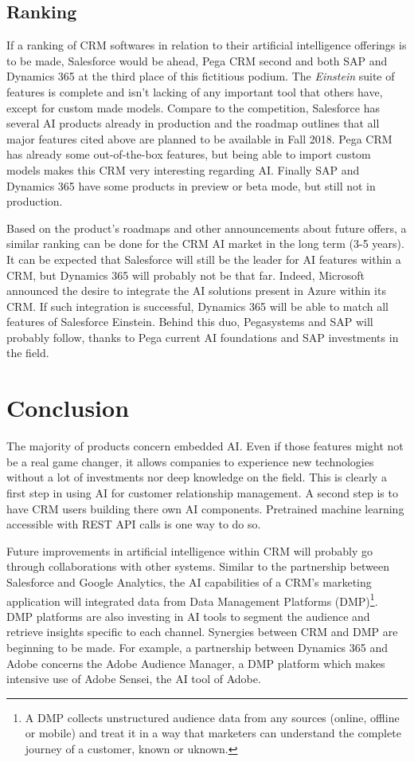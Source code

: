 \subsection{Ranking}
If a ranking of CRM softwares in relation to their artificial intelligence offerings is to be made, Salesforce would be ahead, Pega CRM second and both SAP and Dynamics 365 at the third place of this fictitious podium. The \textit{Einstein} suite of features is complete and isn't lacking of any important tool that others have, except for custom made models. Compare to the competition, Salesforce has several AI products already in production and the roadmap outlines that all major features cited above are planned to be available in Fall 2018. Pega CRM has already some out-of-the-box features, but being able to import custom models makes this CRM very interesting regarding AI. Finally SAP and Dynamics 365 have some products in preview or beta mode, but still not in production. 

Based on the product's roadmaps and other announcements about future offers, a similar ranking can be done for the CRM AI market in the long term (3-5 years). It can be expected that Salesforce will still be the leader for AI features within a CRM, but Dynamics 365 will probably not be that far. Indeed, Microsoft announced the desire to integrate the AI solutions present in Azure within its CRM. If such integration is successful, Dynamics 365 will be able to match all features of Salesforce Einstein. Behind this duo, Pegasystems and SAP will probably follow, thanks to Pega current AI foundations and SAP investments in the field. 


\section{Conclusion}
The majority of products concern embedded AI. Even if those features might not be a real game changer, it allows companies to experience new technologies without a lot of investments nor deep knowledge on the field. This is clearly a first step in using AI for customer relationship management. A second step is to have CRM users building there own AI components. Pretrained machine learning accessible with REST API calls is one way to do so.

Future improvements in artificial intelligence within CRM will probably go through collaborations with other systems. Similar to the partnership between Salesforce and Google Analytics, the AI capabilities of a CRM's marketing application will integrated data from Data Management Platforms (DMP)\footnote{A DMP collects unstructured audience data from any sources (online, offline or mobile) and treat it in a way that marketers can understand the complete journey of a customer, known or uknown.}. DMP platforms are also investing in AI tools to segment the audience and retrieve insights specific to each channel. Synergies between CRM and DMP are beginning to be made. For example, a partnership between Dynamics 365 and Adobe concerns the Adobe Audience Manager, a DMP platform which makes intensive use of Adobe Sensei, the AI tool of Adobe.

